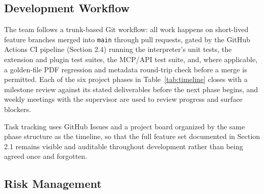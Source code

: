 \documentclass[a4paper,twoside]{article}
\begin{document}
\subsection{Development Workflow}

The team follows a trunk-based Git workflow: all work happens on short-lived feature branches merged into \texttt{main} through pull requests, gated by the GitHub Actions CI pipeline (Section 2.4) running the interpreter's unit tests, the extension and plugin test suites, the MCP/API test suite, and, where applicable, a golden-file PDF regression and metadata round-trip check before a merge is permitted. Each of the six project phases in Table~\ref{tab:timeline} closes with a milestone review against its stated deliverables before the next phase begins, and weekly meetings with the supervisor are used to review progress and surface blockers.

Task tracking uses GitHub Issues and a project board organized by the same phase structure as the timeline, so that the full feature set documented in Section 2.1 remains visible and auditable throughout development rather than being agreed once and forgotten.

\subsection{Risk Management}
\end{document}
